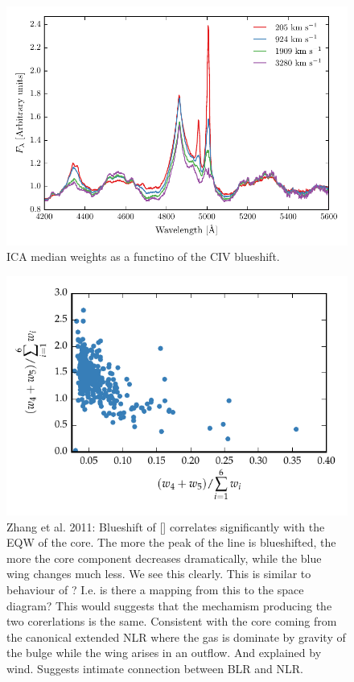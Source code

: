 \begin{figure}
    \centering
    \includegraphics[width=\columnwidth]{figures/chapter04/mfica_composites.pdf} 
    \caption{ICA median weights as a functino of the CIV blueshift.}     
    \label{fig:mfica_composites}
\end{figure}



\begin{figure}
    \centering
    \includegraphics[width=\columnwidth]{figures/chapter04/oiii_core_strength_blueshift.pdf} 
    \caption{Zhang et al. 2011: Blueshift of [] correlates significantly with the EQW of the core. The more the peak of the line is blueshifted, the more the core component decreases dramatically, while the blue wing changes much less. We see this clearly. This is similar to behaviour of ? I.e. is there a mapping from this to the  space diagram? This would suggests that the mechamism producing the two corerlations is the same. Consistent with the core coming from the canonical extended NLR where the gas is dominate by gravity of the bulge while the wing arises in an outflow. And  explained by wind. Suggests intimate connection between BLR and NLR.}     
    \label{fig:compare_gaussian_ica}
\end{figure}

